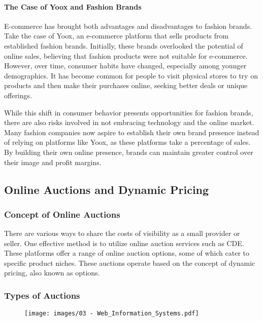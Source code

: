 \paragraph{The Case of Yoox and Fashion
  Brands}\label{the-case-of-yux-and-fashion-brands}

E-commerce has brought both advantages and disadvantages to fashion brands. Take the case of Yoox, an e-commerce platform that sells products from established fashion brands. Initially, these brands overlooked the potential of online sales, believing that fashion products were not suitable for e-commerce. However, over time, consumer habits have changed, especially among younger demographics. It has become common for people to visit physical stores to try on products and then make their purchases online, seeking better deals or unique offerings.

While this shift in consumer behavior presents opportunities for fashion brands, there are also risks involved in not embracing technology and the online market. Many fashion companies now aspire to establish their own brand presence instead of relying on platforms like Yoox, as these platforms take a percentage of sales. By building their own online presence, brands can maintain greater control over their image and profit margins.

\subsection{Online Auctions and Dynamic
  Pricing}\label{online-auctions-and-dynamic-pricing}

\subsubsection{Concept of Online
  Auctions}\label{concept-of-online-auctions}

There are various ways to share the costs of visibility as a small
provider or seller. One effective method is to utilize online auction
services such as CDE. These platforms offer a range of online auction
options, some of which cater to specific product niches. These auctions
operate based on the concept of dynamic pricing, also known as options.

\subsubsection{Types of Auctions}\label{types-of-auctions}

\begin{figure}[!h]
  \centering
  \texttt{[image: images/03 - Web\_Information\_Systems.pdf]}
\end{figure}

